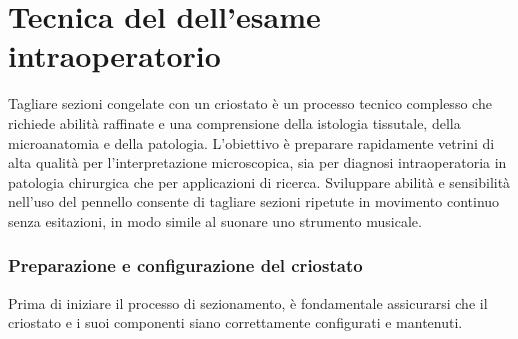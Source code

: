 \chapter{Tecnica del dell'esame intraoperatorio}


Tagliare sezioni congelate con un criostato è un processo tecnico complesso che richiede abilità raffinate e una comprensione della istologia tissutale, della microanatomia e della patologia. L'obiettivo è preparare rapidamente vetrini di alta qualità per l'interpretazione microscopica, sia per diagnosi intraoperatoria in patologia chirurgica che per applicazioni di ricerca. Sviluppare abilità e sensibilità nell'uso del pennello consente di tagliare sezioni ripetute in movimento continuo senza esitazioni, in modo simile al suonare uno strumento musicale.

\subsection{Preparazione e configurazione del criostato}

Prima di iniziare il processo di sezionamento, è fondamentale assicurarsi che il criostato e i suoi componenti siano correttamente configurati e mantenuti.

